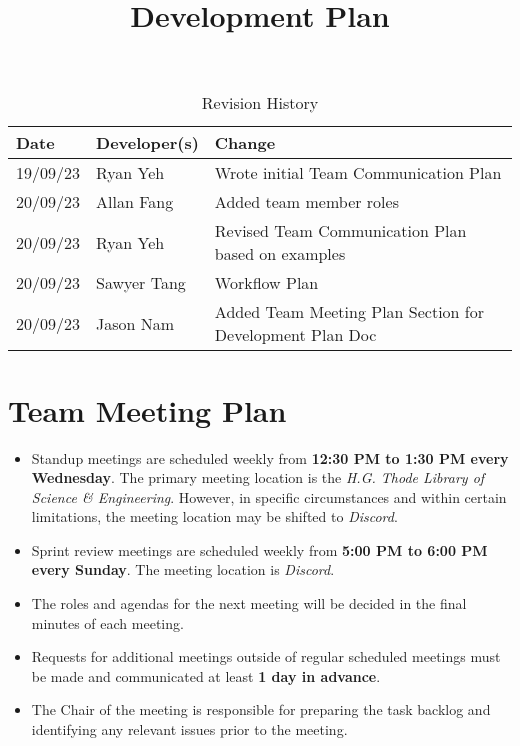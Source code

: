 \documentclass{article}
\title{Development Plan\\\progname}
\author{\authname}
\date{}
\begin{document}
\maketitle

\begin{table}[hp]
\caption{Revision History} \label{TblRevisionHistory}
\begin{tabularx}{\textwidth}{llX}
\toprule
\textbf{Date} & \textbf{Developer(s)} & \textbf{Change}\\
\midrule
19/09/23 & Ryan Yeh & Wrote initial Team Communication Plan\\
20/09/23 & Allan Fang & Added team member roles\\
20/09/23 & Ryan Yeh & Revised Team Communication Plan based on examples\\
20/09/23 & Sawyer Tang & Workflow Plan\\
20/09/23 & Jason Nam & Added Team Meeting Plan Section for Development Plan Doc\\
\bottomrule
\end{tabularx}
\end{table}


\section{Team Meeting Plan}

\begin{itemize}
	\item Standup meetings are scheduled weekly from \textbf{12:30 PM to 1:30 PM every Wednesday}. The primary meeting location is the \emph{H.G. Thode Library of Science \& Engineering}. However, in specific circumstances and within certain limitations, the meeting location may be shifted to \emph{Discord}.
    	\item Sprint review meetings are scheduled weekly from \textbf{5:00 PM to 6:00 PM every Sunday}. The meeting location is \emph{Discord}.
    	\item The roles and agendas for the next meeting will be decided in the final minutes of each meeting.
    	\item Requests for additional meetings outside of regular scheduled meetings must be made and communicated at least \textbf{1 day in advance}.
   	\item The Chair of the meeting is responsible for preparing the task backlog and identifying any relevant issues prior to the meeting.
\end{itemize}
\end{document}
